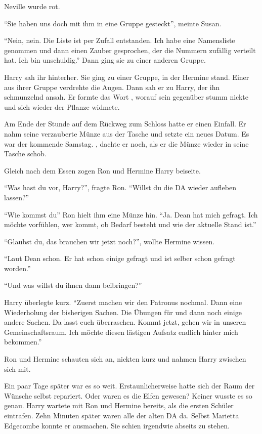 Neville wurde rot.

\enquote{Sie haben uns doch mit ihm in eine Gruppe gesteckt}, meinte Susan.

\enquote{Nein, nein. Die Liste ist per Zufall entstanden. Ich habe eine Namensliste genommen und dann einen Zauber gesprochen, der die Nummern zufällig verteilt hat. Ich bin unschuldig.} Dann ging sie zu einer anderen Gruppe.

Harry sah ihr hinterher. Sie ging zu einer Gruppe, in der Hermine stand. Einer aus ihrer Gruppe verdrehte die Augen. Dann sah er zu Harry, der ihn schmunzelnd ansah. Er formte das Wort , worauf sein gegenüber stumm nickte und sich wieder der Pflanze widmete.

Am Ende der Stunde auf dem Rückweg zum Schloss hatte er einen Einfall. Er nahm seine verzauberte Münze aus der Tasche und setzte ein neues Datum. Es war der kommende Samstag. , dachte er noch, als er die Münze wieder in seine Tasche schob.

Gleich nach dem Essen zogen Ron und Hermine Harry beiseite.

\enquote{Was hast du vor, Harry?}, fragte Ron. \enquote{Willst du die DA wieder aufleben lassen?}

\enquote{Wie kommst du\abs} Ron hielt ihm eine Münze hin. \enquote{Ja. Dean hat mich gefragt. Ich möchte vorfühlen, wer kommt, ob Bedarf besteht und wie der aktuelle Stand ist.}

\enquote{Glaubst du, das brauchen wir jetzt noch?}, wollte Hermine wissen.

\enquote{Laut Dean schon. Er hat schon einige gefragt und ist selber schon gefragt worden.}

\enquote{Und was willst du ihnen dann beibringen?}

Harry überlegte kurz. \enquote{Zuerst machen wir den Patronus nochmal. Dann eine Wiederholung der bisherigen Sachen. Die Übungen für \VgddK und dann noch einige andere Sachen. Da lasst euch überraschen. \gst Kommt jetzt, gehen wir in unseren Gemeinschaftsraum. Ich möchte diesen lästigen Aufsatz endlich hinter mich bekommen.}

Ron und Hermine schauten sich an, nickten kurz und nahmen Harry zwischen sich mit.

Ein paar Tage später war es so weit. Erstaunlicherweise hatte sich der Raum der Wünsche selbst repariert. Oder waren es die Elfen gewesen? Keiner wusste es so genau. Harry wartete mit Ron und Hermine bereits, als die ersten Schüler eintrafen. Zehn Minuten später waren alle der alten DA da. Selbst Marietta Edgecombe konnte er ausmachen. Sie schien irgendwie abseits zu stehen.


